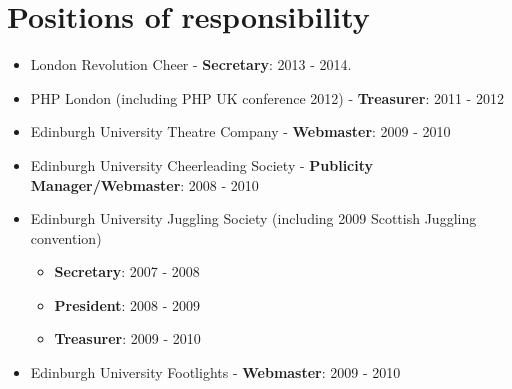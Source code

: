 \documentclass[a4paper]{article}
\begin{document}
\section*{Positions of responsibility}

\begin{itemize}
\item London Revolution Cheer - {\bf Secretary}: 2013 - 2014.
\item PHP London (including PHP UK conference 2012) - {\bf Treasurer}: 2011 - 2012
\item Edinburgh University Theatre Company - {\bf Webmaster}: 2009 - 2010
\item Edinburgh University Cheerleading Society - {\bf Publicity Manager/Webmaster}: 2008 - 2010
\item Edinburgh University Juggling Society (including 2009 Scottish Juggling convention)
	\begin{itemize}
	\item {\bf Secretary}: 2007 - 2008 
	\item {\bf President}: 2008 - 2009 
	\item {\bf Treasurer}: 2009 - 2010
	\end{itemize}
\item Edinburgh University Footlights - {\bf Webmaster}: 2009 - 2010
\end{itemize}
\end{document}
